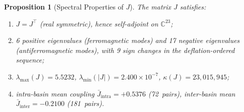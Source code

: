 \documentclass[11pt,a4paper]{article}
\theoremstyle{plain}
\newtheorem{proposition}[theorem]{Proposition}
\theoremstyle{remark}
\newcommand{\C}{\mathbb{C}}
\newcommand{\abs}[1]{\lvert #1 \rvert}
\begin{document}
\begin{proposition}[Spectral Properties of $J$]\label{prop:J-spectrum}
The matrix $J$ satisfies:
\begin{enumerate}[nosep,label=(\roman*)]
  \item $J=J^\top$ (real symmetric), hence self-adjoint on $\C^{23}$;
  \item 6 positive eigenvalues (ferromagnetic modes) and 17 negative
        eigenvalues (antiferromagnetic modes), with 9 sign changes in the
        deflation-ordered sequence;
  \item $\lambda_{\max}(J)=5.5232$,
        $\lambda_{\min}(\abs{J})=2.400\times 10^{-7}$,
        $\kappa(J)=23{,}015{,}945$;
  \item intra-basin mean coupling $\bar J_{\mathrm{intra}}=+0.5376$
        (72~pairs), inter-basin mean $\bar J_{\mathrm{inter}}=-0.2100$
        (181~pairs).
\end{enumerate}
\end{proposition}
\end{document}
